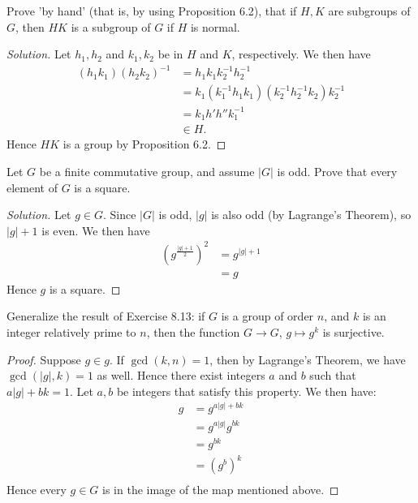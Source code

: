 \documentclass[12pt]{article}
\newenvironment{problem}[2][Problem]{\begin{trivlist}
\item[\hskip \labelsep {\bfseries #1}\hskip \labelsep {\bfseries #2.}]}{\end{trivlist}}
\newenvironment{solution}
  {\renewcommand\qedsymbol{$\blacksquare$}\begin{proof}[Solution]}
{\end{proof}}
\theoremstyle{remark}
\begin{document}
\begin{problem}{8.12}
  Prove 'by hand' (that is, by using Proposition 6.2), that if $H,K$ are subgroups of $G$, then
  $HK$ is a subgroup of $G$ if $H$ is normal.
\end{problem}
\begin{solution}
  Let $h_1,h_2$ and $k_1,k_2$ be in $H$ and $K$, respectively.
  We then have
  \begin{align*}
    (h_1k_1)(h_2k_2)^{-1} &= h_1k_1k_2^{-1}h_2^{-1} \\
    &= k_1(k_1^{-1}h_1k_1)(k_2^{-1}h_2^{-1}k_2)k_2^{-1} \\
    &= k_1h'h''k_1^{-1} \\
    &\in H.
  \end{align*}
  Hence $HK$ is a group by Proposition 6.2.
\end{solution}
\begin{problem}{8.13}
  Let $G$ be a finite commutative group, and assume $|G|$ is odd.
  Prove that every element of $G$ is a square.
\end{problem}
\begin{solution}
  Let $g\in G$.
  Since $|G|$ is odd, $|g|$ is also odd (by Lagrange's Theorem), so $|g|+1$ is even.
  We then have
  \begin{align*}
    \left(g^{\frac{|g|+1}{2}}\right)^2 &= g^{|g|+1} \\
    &= g
  \end{align*}
  Hence $g$ is a square.
\end{solution}
\begin{problem}{8.14}
  Generalize the result of Exercise 8.13: if $G$ is a group of order $n$, and $k$ is an integer
  relatively prime to $n$, then the function $G\to G$, $g\mapsto g^k$ is surjective.
\end{problem}
\begin{proof}
  Suppose $g\in g$.
  If $\gcd(k,n)=1$, then by Lagrange's Theorem, we have $\gcd(|g|,k)=1$ as well.
  Hence there exist integers $a$ and $b$ such that $a|g|+bk=1$.
  Let $a,b$ be integers that satisfy this property.
  We then have:
  \begin{align*}
    g &= g^{a|g|+bk} \\
    &= g^{a|g|}g^{bk} \\
    &= g^{bk} \\
    &= (g^b)^k \\
  \end{align*}
  Hence every $g\in G$ is in the image of the map mentioned above.
\end{proof}
\end{document}

